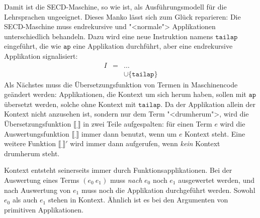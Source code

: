 %
Damit ist die SECD-Maschine, so wie ist, als Ausführungsmodell für
die Lehrsprachen ungeeignet.  Dieses Manko lässt sich zum Glück reparieren: Die
SECD-Maschine muss endrekursive und "<normale"> Applikationen
unterschiedlich behandeln.  Dazu wird eine neue Instruktion namens
$\mathtt{tailap}$ eingeführt, die wie $\mathtt{ap}$ eine Applikation
durchführt, aber eine endrekursive Applikation signalisiert:
%
\begin{eqnarray*}
  I &=& \ldots\\
  &&\cup \{ \mathtt{tailap} \}
\end{eqnarray*}
%
Als Nächstes muss die Übersetzungsfunktion von Termen in Maschinencode
geändert werden:  Applikationen, die Kontext um sich herum haben,
sollen mit $\mathtt{ap}$ übersetzt werden, solche ohne Kontext mit
$\mathtt{tailap}$.  Da der Applikation allein der Kontext nicht
anzusehen ist, sondern nur dem Term "<drumherum">, wird die
Übersetzungsfunktion $\llbracket \underline{~} \rrbracket$ in zwei
Teile aufgespalten: für einen Term $e$ wird die Auswertungsfunktion $\llbracket\underline{~}\rrbracket$ immer dann benutzt, wenn um $e$ Kontext steht.  Eine
weitere Funktion $\llbracket \underline{~} \rrbracket'$ wird immer
dann aufgerufen, wenn \emph{kein} Kontext drumherum steht.

Kontext entsteht seinerseits immer durch Funktionsapplikationen.  Bei
der Auswertung eines Terms $(e_0~e_1)$ muss \emph{nach} $e_0$ noch
$e_1$ ausgewertet werden, und nach Auswertung von $e_1$ muss noch die
Applikation durchgeführt werden.  Sowohl $e_0$ als auch $e_1$ stehen
in Kontext.  Ähnlich ist es bei den Argumenten von primitiven
Applikationen.

